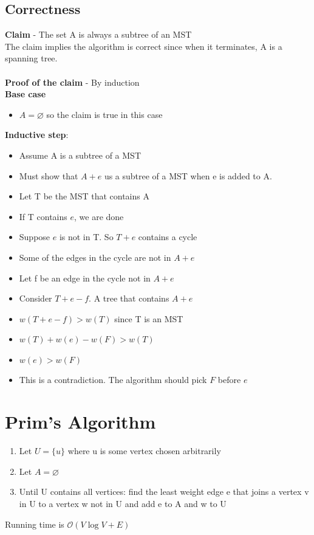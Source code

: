 \documentclass{article}[18pt]
\begin{document}
\subsection{Correctness}
\textbf{Claim} - The set A is always a subtree of an MST\\
The claim implies the algorithm is correct since when it terminates, A is a spanning tree.\\
\\
\textbf{Proof of the claim} - By induction\\
\textbf{Base case}
\begin{itemize}
	\item $A=\varnothing$ so the claim is true in this case
\end{itemize}
\textbf{Inductive step}:
\begin{itemize}
	\item Assume A is a subtree of a MST
	\item Must show that $A+e$ us a subtree of a MST when e is added to A.
	\item Let T be the MST that contains A
	\item If T contains $e$, we are done
	\item Suppose $e$ is not in T. So $T+e$ contains a cycle
	\item Some of the edges in the cycle are not in $A+e$
	\item Let f be an edge in the cycle not in $A+e$
	\item Consider $T+e-f$. A tree that contains $A+e$
	\item $w(T+e-f)> w(T)$ since T is an MST
	\item $w(T)+w(e)-w(F)> w(T)$
	\item $w(e)>w(F)$
	\item This is a contradiction. The algorithm should pick $F$ before $e$
\end{itemize}


\section{Prim's Algorithm}
\begin{enumerate}
	\item Let $U=\{u\}$ where u is some vertex chosen arbitrarily
	\item Let $A=\varnothing$
	\item Until U contains all vertices: find the least weight edge e that joins a vertex v in U to a vertex w not in U and add e to A and w to U
\end{enumerate}
Running time is $\mathcal{O}(V\log V+E)$
\end{document}
